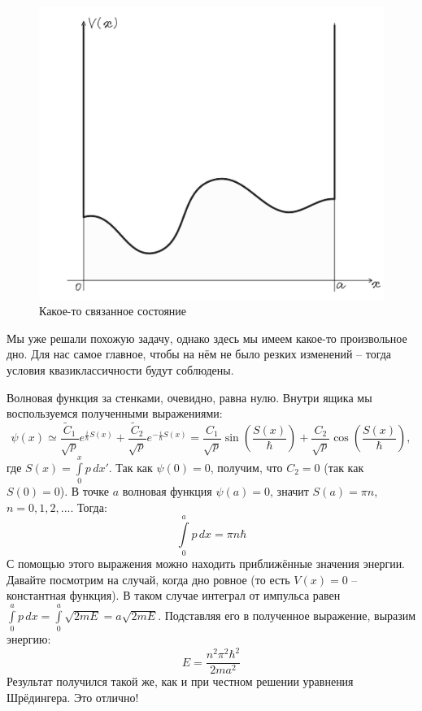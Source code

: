 \begin{figure}[ht]
\centering
\includegraphics[scale=0.2]{class_11/images/bound-state.jpg}
\caption{Какое-то связанное состояние}
\label{fig 11.1}
\end{figure}

Мы уже решали похожую задачу, однако здесь мы имеем какое-то произвольное дно. Для нас самое главное, чтобы на нём не было резких изменений -- тогда условия квазиклассичности будут соблюдены.

Волновая функция за стенками, очевидно, равна нулю. Внутри ящика мы воспользуемся полученными выражениями:
\[
\psi(x) \simeq \frac{\widetilde{C}_1}{\sqrt{p}}e^{\frac{i}{\hbar}S(x)} + \frac{\widetilde{C}_2}{\sqrt{p}}e^{-\frac{i}{\hbar}S(x)} = \frac{C_1}{\sqrt{p}}\sin (\frac{S(x)}{\hbar}) + \frac{C_2}{\sqrt{p}}\cos(\frac{S(x)}{\hbar}),
\]
где $S(x) = \int\limits_{0}^{x}p\, dx'$. Так как $\psi(0) = 0$, получим, что $C_2 = 0$ (так как $S(0) = 0$). В точке $a$ волновая функция $\psi(a) = 0$, значит $S(a) = \pi n$, $n = 0, 1, 2, ...$. Тогда:
\[
\int\limits_{0}^{a}p\, dx = \pi n \hbar
\]
С помощью этого выражения можно находить приближённые значения энергии. Давайте посмотрим на случай, когда дно ровное (то есть $V(x)=0$ -- константная функция). В таком случае интеграл от импульса равен $\int\limits_{0}^{a}p\, dx = \int\limits_{0}^{a}\sqrt{2mE} = a\sqrt{2mE}$. Подставляя его в полученное выражение, выразим энергию:
\[
E = \frac{n^2\pi^2\hbar^2}{2ma^2}
\]
Результат получился такой же, как и при честном решении уравнения Шрёдингера. Это отлично!

